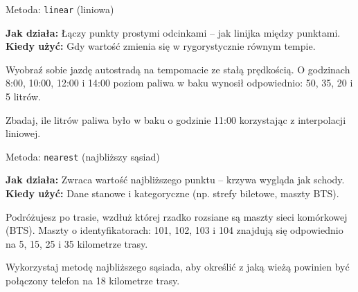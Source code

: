 \documentclass[11pt,aspectratio=169,table]{beamer}
\begin{document}
\begin{frame}{Metoda: \texttt{linear} (liniowa)}
	\begin{tcolorbox}[colback=blue!5!white,colframe=blue!75!black,title=Charakterystyka]
		\textbf{Jak działa:} Łączy punkty prostymi odcinkami – jak linijka między punktami.\\
		\textbf{Kiedy użyć:} Gdy wartość zmienia się w rygorystycznie równym tempie.
	\end{tcolorbox}
		
	\begin{tcolorbox}[colback=white,colframe=black,title=Zadanie]
		Wyobraź sobie jazdę autostradą na tempomacie ze stałą prędkością. O godzinach 8:00, 10:00, 12:00 i 14:00 poziom paliwa w baku wynosił odpowiednio: 50, 35, 20 i 5 litrów. 
		
		Zbadaj, ile litrów paliwa było w baku o godzinie 11:00 korzystając z interpolacji liniowej.
	\end{tcolorbox}
\end{frame}

\begin{frame}{Metoda: \texttt{nearest} (najbliższy sąsiad)}
	\begin{tcolorbox}[colback=cyan!5!white,colframe=cyan!75!black,title=Charakterystyka]
		\textbf{Jak działa:} Zwraca wartość najbliższego punktu – krzywa wygląda jak schody.\\
		\textbf{Kiedy użyć:} Dane stanowe i kategoryczne (np. strefy biletowe, maszty BTS).
	\end{tcolorbox}
		
	\begin{tcolorbox}[colback=white,colframe=black,title=Zadanie]
		Podróżujesz po trasie, wzdłuż której rzadko rozsiane są maszty sieci komórkowej (BTS). Maszty o identyfikatorach: 101, 102, 103 i 104 znajdują się odpowiednio na 5, 15, 25 i 35 kilometrze trasy. 
		
		Wykorzystaj metodę najbliższego sąsiada, aby określić z jaką wieżą powinien być połączony telefon na 18 kilometrze trasy.
	\end{tcolorbox}
\end{frame}
\end{document}
